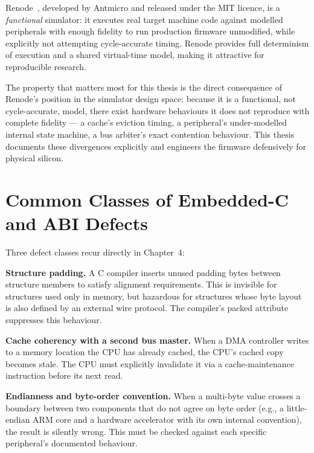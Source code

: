 Renode~\cite{renode}, developed by Antmicro and released under the MIT licence, is a \emph{functional} simulator: it executes real target machine code against modelled peripherals with enough fidelity to run production firmware unmodified, while explicitly not attempting cycle-accurate timing. Renode provides full determinism of execution and a shared virtual-time model, making it attractive for reproducible research.

The property that matters most for this thesis is the direct consequence of Renode's position in the simulator design space: because it is a functional, not cycle-accurate, model, there exist hardware behaviours it does not reproduce with complete fidelity --- a cache's eviction timing, a peripheral's under-modelled internal state machine, a bus arbiter's exact contention behaviour. This thesis documents these divergences explicitly and engineers the firmware defensively for physical silicon.

\section{Common Classes of Embedded-C and ABI Defects}

Three defect classes recur directly in Chapter~4:

\textbf{Structure padding.} A C compiler inserts unused padding bytes between structure members to satisfy alignment requirements. This is invisible for structures used only in memory, but hazardous for structures whose byte layout is also defined by an external wire protocol. The compiler's packed attribute suppresses this behaviour.

\textbf{Cache coherency with a second bus master.} When a DMA controller writes to a memory location the CPU has already cached, the CPU's cached copy becomes stale. The CPU must explicitly invalidate it via a cache-maintenance instruction before its next read.

\textbf{Endianness and byte-order convention.} When a multi-byte value crosses a boundary between two components that do not agree on byte order (e.g., a little-endian ARM core and a hardware accelerator with its own internal convention), the result is silently wrong. This must be checked against each specific peripheral's documented behaviour.